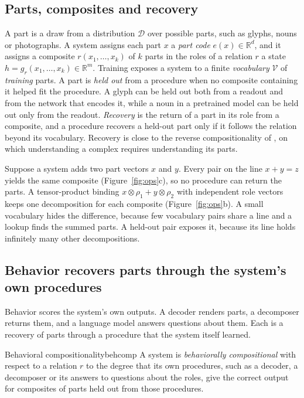 \documentclass[10pt]{article}
\theoremstyle{plain}
\theoremstyle{remark}
\newcommand{\R}{\mathbb{R}}
\newcommand{\D}{\mathcal{D}}
\newcommand{\Voc}{\mathcal{V}}
\begin{document}
\subsection{Parts, composites and recovery}
\label{sec:intuition}

A part is a draw from a distribution $\D$ over possible parts, such as glyphs, nouns or photographs. A system assigns each part $x$ a \emph{part code} $e(x) \in \R^d$, and it assigns a composite $r(x_1, \ldots, x_k)$ of $k$ parts in the roles of a relation $r$ a state $h = g_r(x_1, \ldots, x_k) \in \R^m$. Training exposes a system to a finite \emph{vocabulary} $\Voc$ of \emph{training} parts. A part is \emph{held out} from a procedure when no composite containing it helped fit the procedure. A glyph can be held out both from a readout and from the network that encodes it, while a noun in a pretrained model can be held out only from the readout. \emph{Recovery} is the return of a part in its role from a composite, and a procedure recovers a held-out part only if it follows the relation beyond its vocabulary. Recovery is close to the reverse compositionality of \citet{fodor2002}, on which understanding a complex requires understanding its parts.

Suppose a system adds two part vectors $x$ and $y$. Every pair on the line $x + y = z$ yields the same composite (Figure~\ref{fig:ops}c), so no procedure can return the parts. A tensor-product binding $x \otimes \rho_1 + y \otimes \rho_2$ with independent role vectors \citep{smolensky1990} keeps one decomposition for each composite (Figure~\ref{fig:ops}b). A small vocabulary hides the difference, because few vocabulary pairs share a line and a lookup finds the summed parts. A held-out pair exposes it, because its line holds infinitely many other decompositions.

\subsection{Behavior recovers parts through the system's own procedures}
\label{sec:notions}

Behavior scores the system's own outputs. A decoder renders parts, a decomposer returns them, and a language model answers questions about them. Each is a recovery of parts through a procedure that the system itself learned.

\begin{defbox}{Behavioral compositionality}{behcomp}
A system is \emph{behaviorally compositional} with respect to a relation $r$ to the degree that its own procedures, such as a decoder, a decomposer or its answers to questions about the roles, give the correct output for composites of parts held out from those procedures.
\end{defbox}
\end{document}
